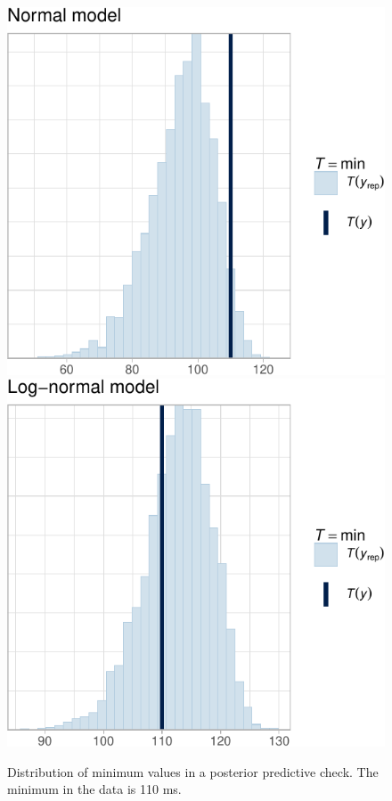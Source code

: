 \documentclass[12pt,ignorenonframetext,aspectratio=169]{beamer}
\begin{document}
\begin{frame}[fragile]
\begin{figure}
\includegraphics[width=0.45\linewidth]{03-compbayes-slides_files/figure-beamer/ppcheckmin-1} \includegraphics[width=0.45\linewidth]{03-compbayes-slides_files/figure-beamer/ppcheckmin-2} \caption{Distribution of minimum values in a posterior predictive check. The minimum in the data is 110 ms.}\label{fig:ppcheckmin}
\end{figure}

\normalsize

\end{frame}
\end{document}
